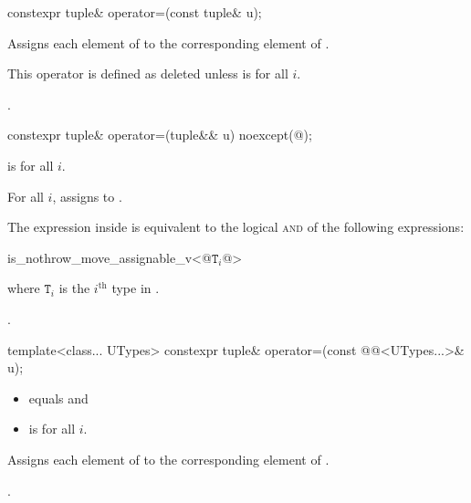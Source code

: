 \documentclass{wg21}
\begin{document}
%
\begin{itemdecl}
    constexpr tuple& operator=(const tuple& u);
\end{itemdecl}

\begin{itemdescr}
    \pnum
    \effects
    Assigns each element of  to the corresponding
    element of .
    
    \pnum
    \remarks
    This operator is defined as deleted unless
     is  for all $i$.
    
    \pnum
    \returns
    .
\end{itemdescr}

%
\begin{itemdecl}
    constexpr tuple& operator=(tuple&& u) noexcept(@\seebelow@);
\end{itemdecl}

\begin{itemdescr}
    \pnum
    \constraints
     is  for all $i$.
    
    \pnum
    \effects
    For all $i$, assigns  to
    .
    
    \pnum
    \remarks
    The expression inside  is equivalent to the logical \textsc{and} of the
    following expressions:
    
    \begin{codeblock}
        is_nothrow_move_assignable_v<@$\mathtt{T}_i$@>
    \end{codeblock}
    where $\mathtt{T}_i$ is the $i^\text{th}$ type in .
    
    \pnum
    \returns
    .
\end{itemdescr}

%
\begin{itemdecl}
    template<class... UTypes> constexpr tuple& operator=(const @@<UTypes...>& u);
\end{itemdecl}

\begin{itemdescr}
    \pnum
    \constraints
    \begin{itemize}
        \item {} equals  and
        \item {} is  for all $i$.
    \end{itemize}
    
    \pnum
    \effects
    Assigns each element of  to the corresponding element
    of .
    
    \pnum
    \returns
    .
\end{itemdescr}
\end{document}
